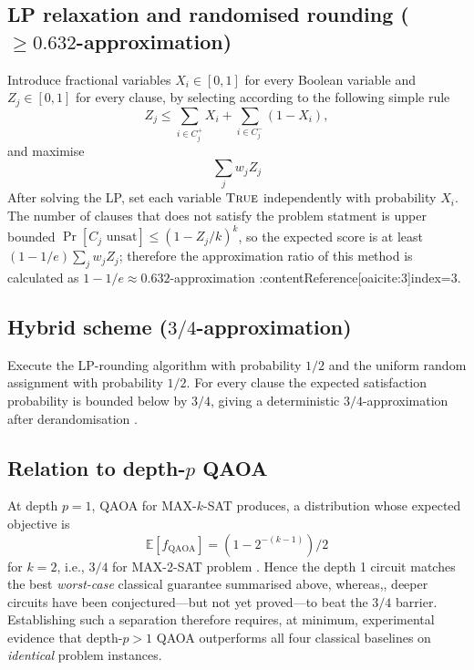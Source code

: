 \documentclass[%
 reprint,
 amsmath,amssymb,
 aps,
]{revtex4-2}
\begin{document}
\subsection{LP relaxation and randomised rounding (\(\ge0.632\)-approximation)}
\label{subsec:lp}

Introduce fractional variables \(X_i\in[0,1]\) for every Boolean variable and \(Z_j\in[0,1]\) for every clause, by selecting according to the following simple rule
$$
  Z_j\le\sum_{i\in C_j^{+}}X_i + \sum_{i\in C_j^{-}}(1-X_i),
$$
and maximise
$$\sum_j w_j Z_j$$
After solving the LP, set each variable \(\textsc{True}\) independently with probability \(X_i\).  The number of clauses that does not satisfy the problem statment is upper bounded \(\Pr[C_j\text{ unsat}]\le(1-Z_j/k)^k\), so the expected score is at least \((1-1/e)\sum_j w_j Z_j\); therefore the approximation ratio of this method is calculated as \(1-1/e\approx0.632\)-approximation :contentReference[oaicite:3]{index=3}.

\subsection{Hybrid scheme (\(3/4\)-approximation)}
\label{subsec:hybrid}

Execute the LP-rounding algorithm with probability \(1/2\) and the uniform random assignment with probability \(1/2\). For every clause the expected satisfaction probability is bounded below by \(3/4\), giving a deterministic \(3/4\)-approximation after derandomisation \cite{GoemansWilliamson1994}.

\subsection{Relation to depth-\(p\) QAOA}
\label{subsec:qaoa-comparison}

At depth \(p=1\), QAOA for MAX-\(k\)-SAT produces, a distribution whose expected objective is
$$\mathbb{E}[f_{\mathrm{QAOA}}]\!=\!(1-2^{-(k-1)})/2$$
for \(k\!=\!2\), i.e., \(3/4\) for MAX-2-SAT problem \cite{farhi2014quantum}.  Hence the depth 1 circuit matches the best \emph{worst-case} classical guarantee summarised above, whereas,, deeper circuits have been conjectured—but not yet proved—to beat the \(3/4\) barrier.  Establishing such a separation therefore requires, at minimum, experimental evidence that depth-\(p>1\) QAOA outperforms all four classical baselines on \emph{identical} problem instances.
\end{document}
